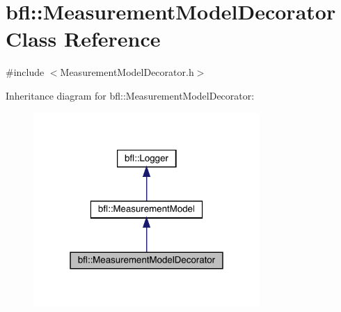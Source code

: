 \hypertarget{classbfl_1_1MeasurementModelDecorator}{}\section{bfl\+:\+:Measurement\+Model\+Decorator Class Reference}
\label{classbfl_1_1MeasurementModelDecorator}


{\ttfamily \#include $<$Measurement\+Model\+Decorator.\+h$>$}



Inheritance diagram for bfl\+:\+:Measurement\+Model\+Decorator\+:
\nopagebreak
\begin{figure}[H]
\begin{center}
\leavevmode
\includegraphics[width=244pt]{classbfl_1_1MeasurementModelDecorator__inherit__graph}
\end{center}
\end{figure}
